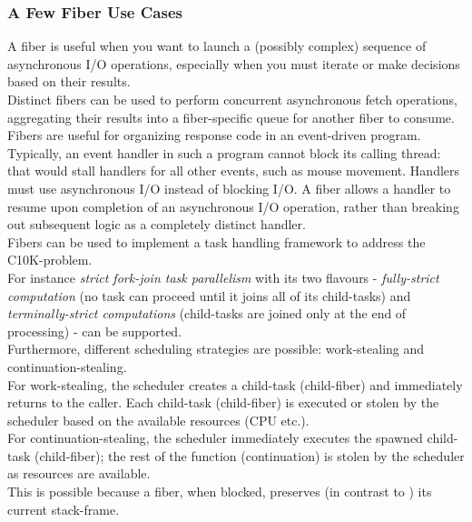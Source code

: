 \subsubsection*{A Few Fiber Use Cases}
A fiber is useful when you want to launch a (possibly complex) sequence of
asynchronous I/O operations, especially when you must iterate or make
decisions based on their results.\\
\newline
Distinct fibers can be used to perform concurrent asynchronous fetch
operations, aggregating their results into a fiber-specific queue for another
fiber to consume.\\
\newline
Fibers are useful for organizing response code in an event-driven program.
Typically, an event handler in such a program cannot block its calling thread:
that would stall handlers for all other events, such as mouse movement.
Handlers must use asynchronous I/O instead of blocking I/O. A fiber allows a
handler to resume upon completion of an asynchronous I/O operation, rather
than breaking out subsequent logic as a completely distinct handler.\\
\newline
Fibers can be used to implement a task handling framework to address the
C10K-problem\cite{c10k}.\\
For instance \textit{strict fork-join task parallelism}\cite{n3832} with its two
flavours - \textit{fully-strict computation}\cite{n3832} (no task
can proceed until it joins all of its child-tasks) and
\textit{terminally-strict computations}\cite{n3832} (child-tasks are joined
only at the end of processing) - can be supported.\\
Furthermore, different scheduling strategies are possible: work-stealing and
continuation-stealing.\\
For work-stealing, the scheduler creates a child-task (child-fiber)
and immediately returns to the caller. Each child-task (child-fiber) is executed or
stolen by the scheduler based on the available resources (CPU etc.).\\
For continuation-stealing, the scheduler immediately executes the
spawned child-task (child-fiber); the rest of the function
(continuation) is stolen by the scheduler as resources are available.\\
This is possible because a fiber, when blocked, preserves (in contrast to \tbb)
its current stack-frame.
\newline
